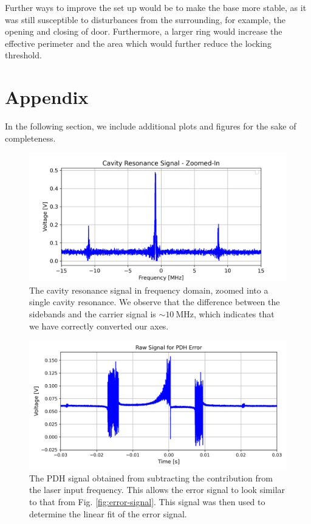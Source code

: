 \documentclass[a4paper]{report}
\numberwithin{equation}{section}
\begin{document}
Further ways to improve the set up would be to make the base more stable, as it was still susceptible to disturbances from the surrounding, for example, the opening and closing of door. Furthermore, a larger ring would increase the effective perimeter and the area which would further reduce the locking threshold. 


\printbibliography

\chapter{Appendix} \label{chap:appendix}

In the following section, we include additional plots and figures for the sake of completeness. 

\begin{figure}[h!]
	\centering
	\includegraphics[width=0.8\columnwidth]{res_peaks_freq_zoomed.png}
	\caption{The cavity resonance signal in frequency domain, zoomed into a single cavity resonance. We observe that 
	the difference between the sidebands and the carrier signal is $\sim \SI{10}{\mega\hertz}$, which indicates that we have
	correctly converted our axes.}
	\label{fig:res_peaks_zoomed}
\end{figure}

\begin{figure}[h!]
	\centering
	\includegraphics[width=0.8\columnwidth]{raw_err_sig_comb.png}
	\caption{The PDH signal obtained from subtracting the contribution from the laser input frequency. This allows the error 
	signal to look similar to that from Fig. \ref{fig:error-signal}. This signal was then used to determine the linear fit of the 
	error signal.}
	\label{fig:pdh_err_combined}
\end{figure}
\end{document}
